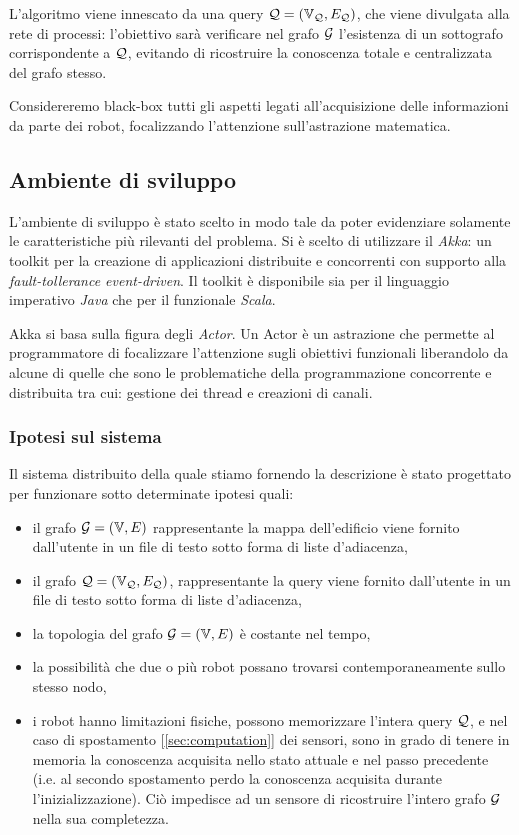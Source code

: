 \documentclass{llncs}
\begin{document}
L'algoritmo viene innescato da una query $\mathcal{Q} = (\mathbb{V}_{\mathcal{Q}}, E_{\mathcal{Q}})$, 
che viene divulgata alla rete di processi: l'obiettivo sarà verificare
nel grafo $\mathcal{G}$ l'esistenza di un sottografo corrispondente a $\mathcal{Q}$,
evitando di ricostruire la conoscenza totale e centralizzata del
grafo stesso.

Considereremo black-box tutti gli aspetti legati all'acquisizione delle informazioni 
da parte dei robot, focalizzando l'attenzione sull'astrazione matematica.



\subsection{Ambiente di sviluppo}
L'ambiente di sviluppo è stato scelto in modo tale da poter evidenziare solamente
le caratteristiche più rilevanti del problema. 
Si è scelto di utilizzare il \emph{Akka}: un toolkit per la creazione di applicazioni 
distribuite e concorrenti con supporto alla \emph{fault-tollerance event-driven}.
Il toolkit è disponibile sia per il linguaggio imperativo \emph{Java} che per il 
funzionale \emph{Scala}.

Akka si basa sulla figura degli \emph{Actor}. Un Actor è un astrazione che permette
al programmatore di focalizzare l'attenzione sugli obiettivi funzionali liberandolo 
da alcune di quelle che sono le  problematiche della programmazione 
concorrente e distribuita tra cui: gestione dei thread e creazioni di canali.
\subsubsection{Ipotesi sul sistema}
\label{sec:hypotesis}
Il sistema distribuito della quale stiamo fornendo la descrizione è stato progettato per funzionare 
sotto determinate ipotesi quali:
\begin{itemize}
	\item il grafo $\mathcal{G} = ( \mathbb{V}, E)$ rappresentante la mappa dell'edificio viene fornito dall'utente in un 
	file di testo sotto forma di liste d'adiacenza,
	\item il grafo  $\mathcal{Q} = (\mathbb{V}_{\mathcal{Q}}, E_{\mathcal{Q}})$,  rappresentante la query viene fornito dall'utente in un 
	file di testo sotto forma di liste d'adiacenza,
	\item la topologia del grafo $\mathcal{G} = ( \mathbb{V}, E)$ è costante nel tempo,
	\item la possibilità che due o più robot possano trovarsi contemporaneamente sullo stesso nodo,
	\item i robot hanno limitazioni fisiche, possono memorizzare l'intera  query $\mathcal{Q}$, e 
	nel caso di spostamento [\ref{sec:computation}] dei sensori, sono in grado di tenere in memoria la conoscenza acquisita nello stato attuale e nel passo precedente (i.e. al secondo spostamento perdo la conoscenza acquisita 
	durante l'inizializzazione). Ciò impedisce ad un sensore di ricostruire l'intero grafo $\mathcal{G}$ nella sua completezza.
\end{itemize}
\end{document}
